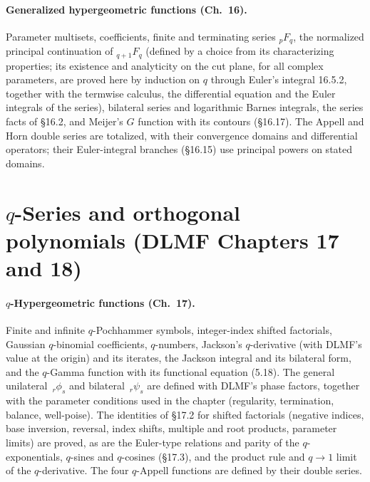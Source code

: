 \documentclass[11pt,a4paper]{article}
\begin{document}
\paragraph{Generalized hypergeometric functions (Ch.~16).} Parameter multisets, coefficients,
finite and terminating series ${}_pF_q$, the normalized principal continuation of
${}_{q+1}F_q$ (defined by a choice from its characterizing properties; its existence and
analyticity on the cut plane, for all complex parameters, are proved here by induction on $q$
through Euler's integral 16.5.2, together with the termwise calculus, the differential
equation and the Euler integrals of the series), bilateral series and logarithmic Barnes integrals, the series facts of
\S16.2, and Meijer's $G$ function with its contours (\S16.17). The Appell and Horn double series
are totalized, with their convergence domains and differential operators; their Euler-integral
branches (\S16.15) use principal powers on stated domains.

\section{$q$-Series and orthogonal polynomials (DLMF Chapters 17 and 18)}

\paragraph{$q$-Hypergeometric functions (Ch.~17).} Finite and infinite $q$-Pochhammer symbols,
integer-index shifted factorials, Gaussian $q$-binomial coefficients, $q$-numbers, Jackson's
$q$-derivative (with DLMF's value at the origin) and its iterates, the Jackson integral and
its bilateral form, and the $q$-Gamma function with its functional equation (5.18). The general
unilateral $\,{}_r\phi_s$ and bilateral $\,{}_r\psi_s$ are defined with DLMF's phase factors,
together with the parameter conditions used in the chapter (regularity, termination, balance,
well-poise). The identities of \S17.2 for shifted factorials (negative indices, base inversion,
reversal, index shifts, multiple and root products, parameter limits) are proved, as are the
Euler-type relations and parity of the $q$-exponentials, $q$-sines and $q$-cosines (\S17.3),
and the product rule and $q\to1$ limit of the $q$-derivative. The four $q$-Appell functions are
defined by their double series.
\end{document}
